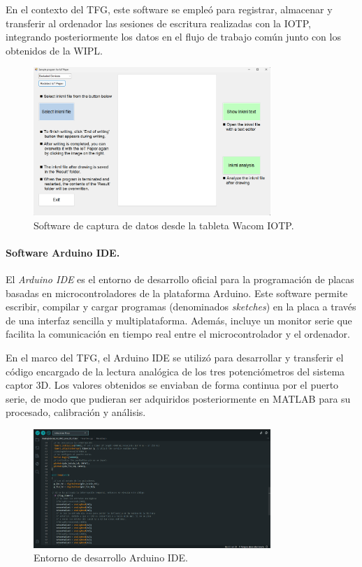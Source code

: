 \documentclass[12pt,a4paper,oneside]{report}
\begin{document}
En el contexto del TFG, este software se empleó para registrar, 
almacenar y transferir al ordenador las sesiones de escritura 
realizadas con la \acrshort{IOTP}, integrando posteriormente los 
datos en el flujo de trabajo común junto con los obtenidos de la 
\acrshort{WIPL}.

\begin{figure}[H]
\centering
\includegraphics[width=0.8\textwidth]{figuras/interfazIOTP.png}
\caption{Software de captura de datos desde la tableta Wacom \acrshort{IOTP}.}
\label{fig:IOTPSoftware}
\end{figure}


\paragraph{Software Arduino IDE.}El \textit{Arduino IDE} es el entorno de desarrollo oficial para la 
programación de placas basadas en microcontroladores de la 
plataforma Arduino. Este software permite escribir, compilar y 
cargar programas (denominados \textit{sketches}) en la placa a 
través de una interfaz sencilla y multiplataforma. Además, 
incluye un monitor serie que facilita la comunicación en tiempo 
real entre el microcontrolador y el ordenador. 

En el marco del TFG, el Arduino IDE se utilizó para desarrollar y 
transferir el código encargado de la lectura analógica de los tres 
potenciómetros del sistema captor 3D. Los valores obtenidos se 
enviaban de forma continua por el puerto serie, de modo que 
pudieran ser adquiridos posteriormente en MATLAB para su 
procesado, calibración y análisis. 


\begin{figure}[H]
\centering  
\includegraphics[width=0.8\textwidth]{figuras/interfazIDEArduino.png}
\caption{Entorno de desarrollo Arduino IDE.}
\label{fig:ArduinoIDE}
\end{figure}
\end{document}

